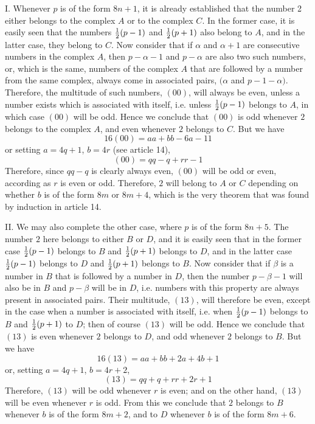 \documentclass[twoside,12pt]{memoir}
\let\oldfrac\frac
\def\frac#1#2{\mathchoice{\tfrac{#1}{#2}}{\oldfrac{#1}{#2}}{\genfrac{}{}{}{2}{#1}{#2\mathstrut}}{\genfrac{}{}{}{3}{#1}{#2\mathstrut}}}
\begin{document}
I. Whenever \(p\) is of the form \(8n+1\), it is already established that the number 2 either belongs to the complex \(A\) or to the complex \(C\). In the former case, it is easily seen that the numbers \(\frac{1}{2}(p-1)\) and \(\frac{1}{2}(p+1)\) also belong to \(A\), and in the latter case, they belong to \(C\). Now consider that if \(\alpha\) and \(\alpha+1\) are consecutive numbers in the complex \(A\), then \(p-\alpha-1\) and \(p-\alpha\) are also two such numbers, or, which is the same, numbers of the complex \(A\) that are followed by a number from the same complex, always come in associated pairs, \((\alpha\) and \(p-1-\alpha)\). Therefore, the multitude of such numbers, \((00)\), will always be even, unless a number exists which is associated with itself, i{.}e{.} unless \(\frac{1}{2}(p-1)\) belongs to \(A\), in which case \((00)\) will be odd. Hence we conclude that \((00)\) is odd whenever \(2\) belongs to the complex \(A\), and even whenever \(2\) belongs to \(C\). But we have
\[16(00)=a a+b b-6 a-11\]
or setting \(a=4q+1\), \(b=4r\) (see article 14),
\[(00)=q q-q+r r-1\]
Therefore, since \(q q-q\) is clearly always even, \((00)\) will be odd or even, according as \(r\) is even or odd.  Therefore, \(2\) will belong to \(A\) or \(C\) depending on whether \(b\) is of the form \(8m\) or \(8m+4\), which is the very theorem that was found by induction in article 14.

II. We may also complete the other case, where \(p\) is of the form \(8n+5\). The number \(2\) here belongs to either \(B\) or \(D\), and it is easily seen that in the former case \(\frac{1}{2}(p-1)\) belongs to \(B\) and \(\frac{1}{2}(p+1)\) belongs to \(D\), and in the latter case \(\frac{1}{2}(p-1)\) belongs to \(D\) and \(\frac{1}{2}(p+1)\) belongs to \(B\). Now consider that if \(\beta\) is a number in \(B\) that is followed by a number in \(D\), then the number \(p-\beta-1\) will also be in \(B\) and \(p-\beta\) will be in \(D\), i{.}e{.} numbers with this property are always present in associated pairs. Their multitude, \((13)\), will therefore be even, except in the case when a number is associated with itself, i{.}e{.} when \(\frac{1}{2}(p-1)\) belongs to \(B\) and \(\frac{1}{2}(p+1)\) to \(D\); then of course \((13)\) will be odd. Hence we conclude that \((13)\) is even whenever \(2\) belongs to \(D\), and odd whenever \(2\) belongs to \(B\). But we have
\[16(13)=a a+b b+2 a+4 b+1\]
or, setting \(a=4q+1\), \(b=4r+2\),
\[(13)=q q+q+r r+2 r+1\]
Therefore, \((13)\) will be odd whenever \(r\) is even; and on the other hand, \((13)\) will be even whenever \(r\) is odd. From this we conclude that \(2\) belongs to \(B\) whenever \(b\) is of the form \(8m+2\), and to \(D\) whenever \(b\) is of the form \(8m+6\).
%
\end{document}
